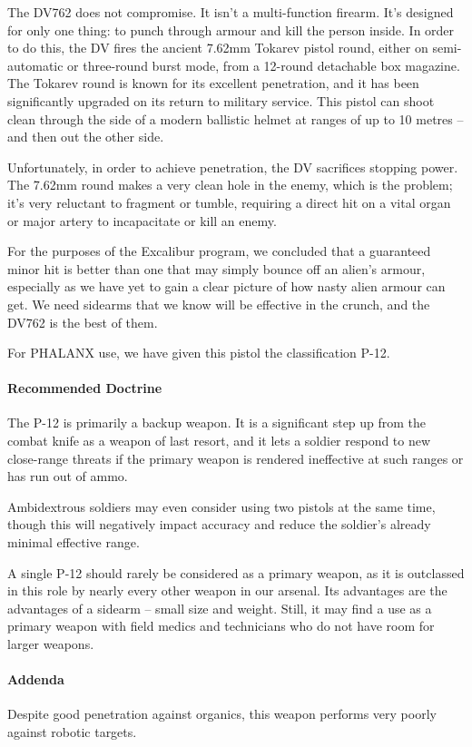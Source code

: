 The DV762 does not compromise. It isn't a multi-function firearm. It's designed for only one thing: to punch through armour and kill the person inside. In order to do this, the DV fires the ancient 7.62mm Tokarev pistol round, either on semi-automatic or three-round burst mode, from a 12-round detachable box magazine. The Tokarev round is known for its excellent penetration, and it has been significantly upgraded on its return to military service. This pistol can shoot clean through the side of a modern ballistic helmet at ranges of up to 10 metres -- and then out the other side.

Unfortunately, in order to achieve penetration, the DV sacrifices stopping power. The 7.62mm round makes a very clean hole in the enemy, which is the problem; it's very reluctant to fragment or tumble, requiring a direct hit on a vital organ or major artery to incapacitate or kill an enemy.

For the purposes of the Excalibur program, we concluded that a guaranteed minor hit is better than one that may simply bounce off an alien's armour, especially as we have yet to gain a clear picture of how nasty alien armour can get. We need sidearms that we know will be effective in the crunch, and the DV762 is the best of them.

For PHALANX use, we have given this pistol the classification P-12.
\paragraph*{Recommended Doctrine}
The P-12 is primarily a backup weapon. It is a significant step up from the combat knife as a weapon of last resort, and it lets a soldier respond to new close-range threats if the primary weapon is rendered ineffective at such ranges or has run out of ammo.

Ambidextrous soldiers may even consider using two pistols at the same time, though this will negatively impact accuracy and reduce the soldier's already minimal effective range.

A single P-12 should rarely be considered as a primary weapon, as it is outclassed in this role by nearly every other weapon in our arsenal. Its advantages are the advantages of a sidearm -- small size and weight. Still, it may find a use as a primary weapon with field medics and technicians who do not have room for larger weapons.
\paragraph*{Addenda}
Despite good penetration against organics, this weapon performs very poorly against robotic targets.
